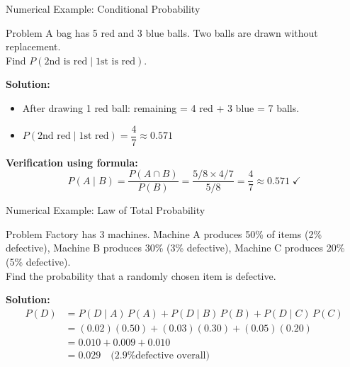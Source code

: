 \begin{frame}{Numerical Example: Conditional Probability}
\begin{exampleblock}{Problem}
A bag has 5 red and 3 blue balls. Two balls are drawn without replacement.\\
Find $P(\text{2nd is red} \mid \text{1st is red})$.
\end{exampleblock}
\textbf{Solution:}
\begin{itemize}
    \item After drawing 1 red ball: remaining = 4 red + 3 blue = 7 balls.
    \item $P(\text{2nd red} \mid \text{1st red}) = \dfrac{4}{7} \approx \mathbf{0.571}$
\end{itemize}
\textbf{Verification using formula:}
\[
P(A \mid B) = \frac{P(A \cap B)}{P(B)} = \frac{5/8 \times 4/7}{5/8} = \frac{4}{7} \approx 0.571 \;\checkmark
\]
\end{frame}

\begin{frame}{Numerical Example: Law of Total Probability}
\begin{exampleblock}{Problem}
Factory has 3 machines. Machine A produces 50\% of items (2\% defective), Machine B produces 30\% (3\% defective), Machine C produces 20\% (5\% defective).\\
Find the probability that a randomly chosen item is defective.
\end{exampleblock}
\textbf{Solution:}
\begin{align*}
P(D) &= P(D\mid A)\,P(A) + P(D\mid B)\,P(B) + P(D\mid C)\,P(C)\\
     &= (0.02)(0.50) + (0.03)(0.30) + (0.05)(0.20)\\
     &= 0.010 + 0.009 + 0.010\\
     &= \mathbf{0.029} \quad \text{(2.9\% defective overall)}
\end{align*}
\end{frame}
